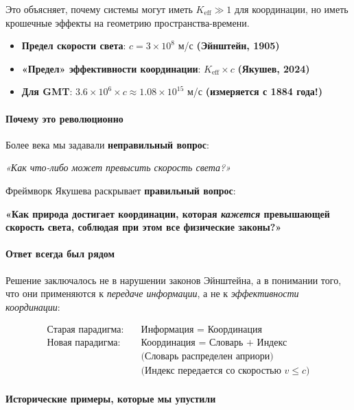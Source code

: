 \documentclass[11pt,a4paper]{article}
\begin{document}
	Это объясняет, почему системы могут иметь $K_{\mathrm{eff}} \gg 1$ для координации, но иметь крошечные эффекты на геометрию пространства-времени.
	\begin{itemize}
		\item \textbf{Предел скорости света}: $c = 3 \times 10^8$ м/с \textbf{(Эйнштейн, 1905)}
		\item \textbf{«Предел» эффективности координации}: $K_{\mathrm{eff}} \times c$ \textbf{(Якушев, 2024)}
		\item \textbf{Для GMT}: $3.6 \times 10^6 \times c \approx 1.08 \times 10^{15}$ м/с \textbf{(измеряется с 1884 года!)}
	\end{itemize}
	
	\paragraph{Почему это революционно}
	Более века мы задавали \textbf{неправильный вопрос}:
	\begin{center}
		\itshape «Как что-либо может превысить скорость света?» 
	\end{center}
	
	Фреймворк Якушева раскрывает \textbf{правильный вопрос}:
	\begin{center}
		\bfseries «Как природа достигает координации, которая \emph{кажется} превышающей скорость света, соблюдая при этом все физические законы?»
	\end{center}
	
	\paragraph{Ответ всегда был рядом}
	Решение заключалось не в нарушении законов Эйнштейна, а в понимании того, что они применяются к \emph{передаче информации}, а не к \emph{эффективности координации}:
	
	\begin{align*}
		\textbf{Старая парадигма:} & \quad \text{Информация = Координация} \\
		\textbf{Новая парадигма:} & \quad \text{Координация = Словарь + Индекс} \\
		& \quad \text{(Словарь распределен априори)} \\
		& \quad \text{(Индекс передается со скоростью $v \leq c$)}
	\end{align*}
	
	\paragraph{Исторические примеры, которые мы упустили}
	
\end{document}
